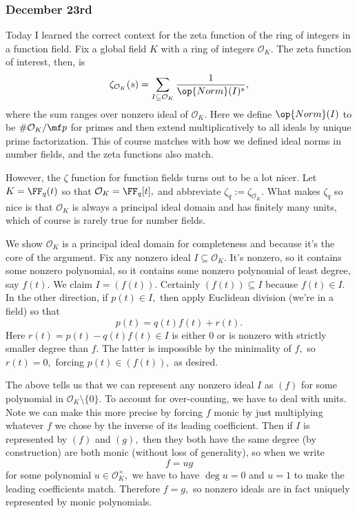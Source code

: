 \subsubsection{December 23rd}
Today I learned the correct context for the zeta function of the ring of integers in a function field. Fix a global field $K$ with a ring of integers $\mathcal O_K.$ The zeta function of interest, then, is
\[\zeta_{\mathcal O_K}(s)=\sum_{I\subseteq\mathcal O_K}\frac1{\op{Norm}(I)^s},\]
where the sum ranges over nonzero ideal of $\mathcal O_K.$ Here we define $\op{Norm}(I)$ to be $\#\mathcal O_K/\mf p$ for primes and then extend multiplicatively to all ideals by unique prime factorization. This of course matches with how we defined ideal norms in number fields, and the zeta functions also match.

However, the $\zeta$ function for function fields turns out to be a lot nicer. Let $K=\FF_q(t)$ so that $\mathcal O_K=\FF_q[t],$ and abbreviate $\zeta_q:=\zeta_{\mathcal O_K}.$ What makes $\zeta_q$ so nice is that $\mathcal O_K$ is always a principal ideal domain and has finitely many units, which of course is rarely true for number fields.

We show $\mathcal O_K$ is a principal ideal domain for completeness and because it's the core of the argument. Fix any nonzero ideal $I\subseteq\mathcal O_K.$ It's nonzero, so it contains some nonzero polynomial, so it contains some nonzero polynomial of least degree, say $f(t).$ We claim $I=(f(t)).$ Certainly $(f(t))\subseteq I$ because $f(t)\in I.$ In the other direction, if $p(t)\in I,$ then apply Euclidean division (we're in a field) so that
\[p(t)=q(t)f(t)+r(t).\]
Here $r(t)=p(t)-q(t)f(t)\in I$ is either $0$ or is nonzero with strictly smaller degree than $f.$ The latter is impossible by the minimality of $f,$ so $r(t)=0,$ forcing $p(t)\in(f(t)),$ as desired.

The above tells us that we can represent any nonzero ideal $I$ as $(f)$ for some polynomial in $\mathcal O_K\setminus\{0\}.$ To account for over-counting, we have to deal with units. Note we can make this more precise by forcing $f$ monic by just multiplying whatever $f$ we chose by the inverse of its leading coefficient. Then if $I$ is represented by $(f)$ and $(g),$ then they both have the same degree (by construction) are both monic (without loss of generality), so when we write
\[f=ug\]
for some polynomial $u\in\mathcal O_K^\times,$ we have to have $\deg u=0$ and $u=1$ to make the leading coefficients match. Therefore $f=g,$ so nonzero ideals are in fact uniquely represented by monic polynomials.

